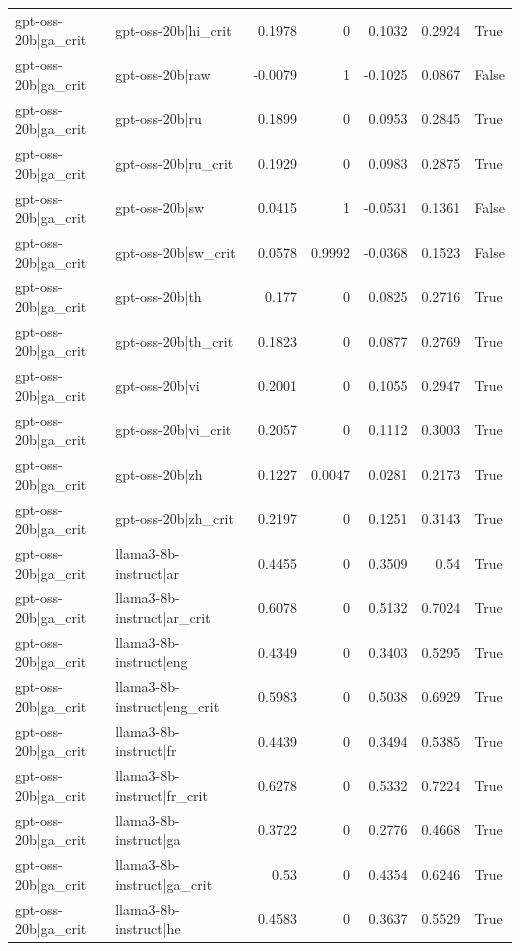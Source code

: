 \begin{table}
\begin{tabular}{l l r r r r l}
gpt-oss-20b|ga_crit & gpt-oss-20b|hi_crit & 0.1978 & 0 & 0.1032 & 0.2924 & True \\
gpt-oss-20b|ga_crit & gpt-oss-20b|raw & -0.0079 & 1 & -0.1025 & 0.0867 & False \\
gpt-oss-20b|ga_crit & gpt-oss-20b|ru & 0.1899 & 0 & 0.0953 & 0.2845 & True \\
gpt-oss-20b|ga_crit & gpt-oss-20b|ru_crit & 0.1929 & 0 & 0.0983 & 0.2875 & True \\
gpt-oss-20b|ga_crit & gpt-oss-20b|sw & 0.0415 & 1 & -0.0531 & 0.1361 & False \\
gpt-oss-20b|ga_crit & gpt-oss-20b|sw_crit & 0.0578 & 0.9992 & -0.0368 & 0.1523 & False \\
gpt-oss-20b|ga_crit & gpt-oss-20b|th & 0.177 & 0 & 0.0825 & 0.2716 & True \\
gpt-oss-20b|ga_crit & gpt-oss-20b|th_crit & 0.1823 & 0 & 0.0877 & 0.2769 & True \\
gpt-oss-20b|ga_crit & gpt-oss-20b|vi & 0.2001 & 0 & 0.1055 & 0.2947 & True \\
gpt-oss-20b|ga_crit & gpt-oss-20b|vi_crit & 0.2057 & 0 & 0.1112 & 0.3003 & True \\
gpt-oss-20b|ga_crit & gpt-oss-20b|zh & 0.1227 & 0.0047 & 0.0281 & 0.2173 & True \\
gpt-oss-20b|ga_crit & gpt-oss-20b|zh_crit & 0.2197 & 0 & 0.1251 & 0.3143 & True \\
gpt-oss-20b|ga_crit & llama3-8b-instruct|ar & 0.4455 & 0 & 0.3509 & 0.54 & True \\
gpt-oss-20b|ga_crit & llama3-8b-instruct|ar_crit & 0.6078 & 0 & 0.5132 & 0.7024 & True \\
gpt-oss-20b|ga_crit & llama3-8b-instruct|eng & 0.4349 & 0 & 0.3403 & 0.5295 & True \\
gpt-oss-20b|ga_crit & llama3-8b-instruct|eng_crit & 0.5983 & 0 & 0.5038 & 0.6929 & True \\
gpt-oss-20b|ga_crit & llama3-8b-instruct|fr & 0.4439 & 0 & 0.3494 & 0.5385 & True \\
gpt-oss-20b|ga_crit & llama3-8b-instruct|fr_crit & 0.6278 & 0 & 0.5332 & 0.7224 & True \\
gpt-oss-20b|ga_crit & llama3-8b-instruct|ga & 0.3722 & 0 & 0.2776 & 0.4668 & True \\
gpt-oss-20b|ga_crit & llama3-8b-instruct|ga_crit & 0.53 & 0 & 0.4354 & 0.6246 & True \\
gpt-oss-20b|ga_crit & llama3-8b-instruct|he & 0.4583 & 0 & 0.3637 & 0.5529 & True \\

\end{tabular}
\end{table}
